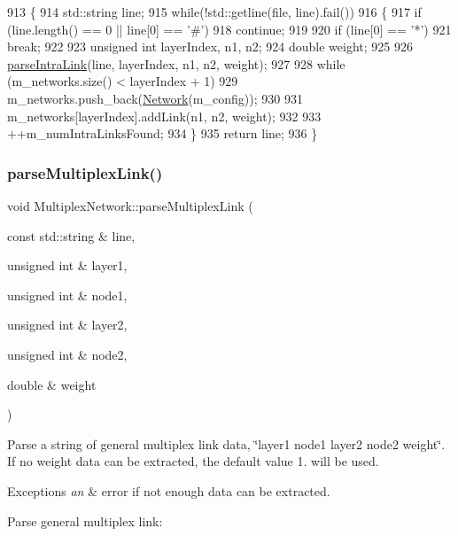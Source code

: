 \begin{DoxyCode}
913 \{
914     std::string line;
915     \textcolor{keywordflow}{while}(!std::getline(file, line).fail())
916     \{
917         \textcolor{keywordflow}{if} (line.length() == 0 || line[0] == \textcolor{charliteral}{'#'})
918             \textcolor{keywordflow}{continue};
919 
920         \textcolor{keywordflow}{if} (line[0] == \textcolor{charliteral}{'*'})
921             \textcolor{keywordflow}{break};
922 
923         \textcolor{keywordtype}{unsigned} \textcolor{keywordtype}{int} layerIndex, n1, n2;
924         \textcolor{keywordtype}{double} weight;
925 
926         \mbox{\hyperlink{classMultiplexNetwork_a3d6c1aff64a77c74e9c998a796762777}{parseIntraLink}}(line, layerIndex, n1, n2, weight);
927 
928         \textcolor{keywordflow}{while} (m\_networks.size() < layerIndex + 1)
929             m\_networks.push\_back(\mbox{\hyperlink{classNetwork}{Network}}(m\_config));
930 
931         m\_networks[layerIndex].addLink(n1, n2, weight);
932 
933         ++m\_numIntraLinksFound;
934     \}
935     \textcolor{keywordflow}{return} line;
936 \}
\end{DoxyCode}
\mbox{\label{classMultiplexNetwork_acb4b8c1bb1c8d4fd613ca467436e18eb}} 
\subsubsection{\texorpdfstring{parse\+Multiplex\+Link()}{parseMultiplexLink()}}
{\footnotesize\ttfamily void Multiplex\+Network\+::parse\+Multiplex\+Link (\begin{DoxyParamCaption}\item[{const std\+::string \&}]{line,  }\item[{unsigned int \&}]{layer1,  }\item[{unsigned int \&}]{node1,  }\item[{unsigned int \&}]{layer2,  }\item[{unsigned int \&}]{node2,  }\item[{double \&}]{weight }\end{DoxyParamCaption})\hspace{0.3cm}{\ttfamily [protected]}}

Parse a string of general multiplex link data, \char`\"{}layer1 node1 layer2 node2 weight\char`\"{}. If no weight data can be extracted, the default value 1. will be used. 
\begin{DoxyExceptions}{Exceptions}
{\em an} & error if not enough data can be extracted.\\
\hline
\end{DoxyExceptions}
Parse general multiplex link\+:

